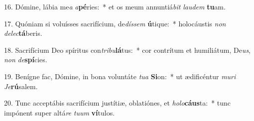 16. Dómine, lábia me\textit{a} \textit{a}\textbf{pé}ries:~*  et os meum annuntiá\textit{bit} \textit{lau}\textit{dem} \textbf{tu}am.\

17. Quóniam si voluísses sacrifícium, de\textit{dís}\textit{sem} \textbf{ú}tique:~*  holocáustis \textit{non} \textit{de}\textit{lec}\textbf{tá}beris.\

18. Sacrifícium Deo spíritus con\textit{tri}\textit{bu}\textbf{lá}tus:~*  cor contrítum et humiliátum, De\textit{us}, \textit{non} \textit{de}\textbf{spí}cies.\

19. Benígne fac, Dómine, in bona voluntáte \textit{tu}\textit{a} \textbf{Si}on:~*  ut ædificéntur \textit{mu}\textit{ri} \textit{Je}\textbf{rú}salem.\

20. Tunc acceptábis sacrifícium justítiæ, oblatiónes, et \textit{ho}\textit{lo}\textbf{cáus}ta:~*  tunc impónent super altá\textit{re} \textit{tu}\textit{um} \textbf{ví}tulos.\

